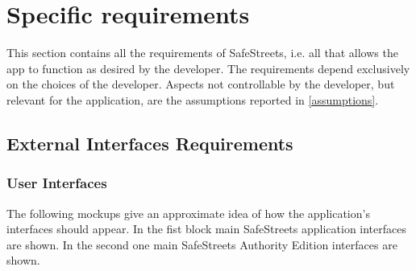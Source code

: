 \documentclass{article}
\begin{document}
	\section{Specific requirements}
		This section contains all the requirements of SafeStreets, i.e. all that allows the app to function as desired by the developer. The requirements depend exclusively on the choices of the developer. Aspects not controllable by the developer, but relevant for the application, are the assumptions reported in \ref{assumptions}.
		
		\subsection{External Interfaces Requirements}
		
			\subsubsection{User Interfaces}
		    The following mockups give an approximate idea of how the application’s interfaces should appear. In the fist block main SafeStreets application interfaces are shown. In the second one main SafeStreets Authority Edition interfaces are shown.
			
\end{document}
